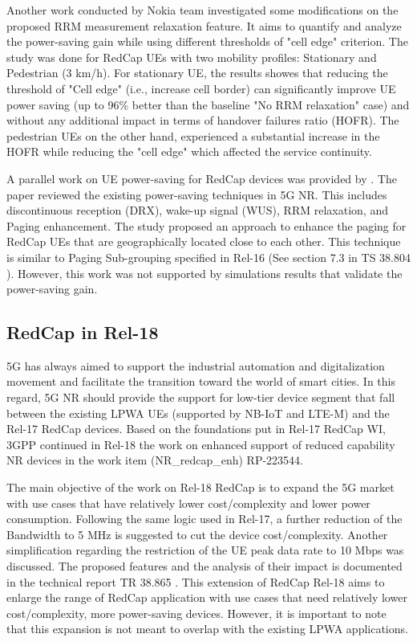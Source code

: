 \documentclass[conference]{IEEEtran}
\begin{document}
Another work conducted by Nokia team \cite{tayyab_energy_2022} investigated some modifications on the proposed RRM measurement relaxation feature. It aims to quantify and analyze the power-saving gain while using different thresholds of "cell edge" criterion. The study was done for RedCap UEs with two mobility profiles: Stationary and Pedestrian (3 km/h). For stationary UE, the results showes that reducing the threshold of "Cell edge" (i.e., increase cell border) can significantly improve UE power saving (up to 96\% better than the baseline "No RRM relaxation" case) and without any additional impact in terms of handover failures ratio (HOFR). The pedestrian UEs on the other hand, experienced a substantial increase in the HOFR while reducing the "cell edge" which affected the service continuity.

A parallel work on UE power-saving for RedCap devices was provided by \cite{li_radio_2022}. The paper reviewed the existing power-saving techniques in 5G NR. This includes discontinuous reception (DRX), wake-up signal (WUS), RRM relaxation, and Paging enhancement.  The study proposed an approach to enhance the paging for RedCap UEs that are geographically located close to each other. This technique is similar to Paging Sub-grouping specified in Rel-16 (See section 7.3 in TS 38.804 \cite{3gpp_study_nodate-4_38.804}). However, this work was not supported by simulations results that validate the power-saving gain.   

\subsection{RedCap in Rel-18}
5G has always aimed to support the industrial automation and digitalization movement and facilitate the transition toward the world of smart cities. In this regard, 5G NR should provide the support for low-tier device segment that fall between the existing LPWA UEs (supported by NB-IoT and LTE-M) and the Rel-17 RedCap devices. Based on the foundations put in Rel-17 RedCap WI, 3GPP continued in Rel-18 the work on enhanced support of reduced capability NR devices in the work item (NR\_redcap\_enh) \cite{3gpp_revised_2022_RP-223544} RP-223544.

The main objective of the work on Rel-18 RedCap is to expand the 5G market with use cases that have relatively lower cost/complexity and lower power consumption. Following the same logic used in Rel-17, a further reduction of the Bandwidth to 5 MHz is suggested to cut the device cost/complexity. Another simplification regarding the restriction of the UE peak data rate to 10 Mbps was discussed. The proposed features and the analysis of their impact is documented in the technical report TR 38.865 \cite{3gpp_study_2022_38.865}. This extension of RedCap Rel-18 aims to enlarge the range of RedCap application with use cases that need relatively lower cost/complexity, more power-saving devices. However, it is important to note that this expansion is not meant to overlap with the existing LPWA applications.
\end{document}
